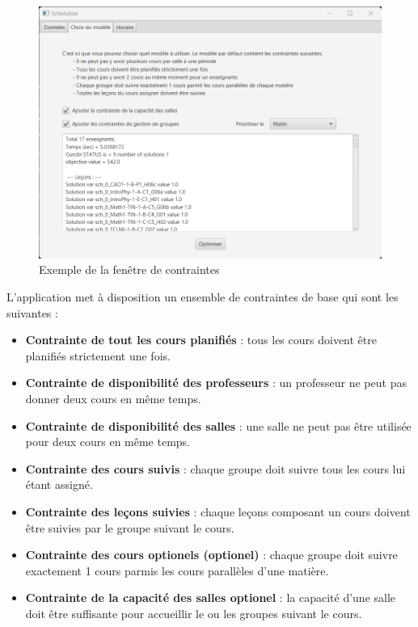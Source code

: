 \begin{figure}[H]
    \centering
    \includegraphics[width=1\textwidth]{./assets/figures/constraintsWindow.png}
    \caption{Exemple de la fenêtre de contraintes}
\end{figure}
\vspace{\baselineskip}

L'application met à disposition un ensemble de contraintes de base qui sont les suivantes :
\begin{itemize}
    \item \textbf{Contrainte de tout les cours planifiés} : tous les cours doivent être planifiés strictement une fois.
    \item \textbf{Contrainte de disponibilité des professeurs} : un professeur ne peut pas donner deux cours en même temps.
    \item \textbf{Contrainte de disponibilité des salles} : une salle ne peut pas être utilisée pour deux cours en même temps.
    \item \textbf{Contrainte des cours suivis} : chaque groupe doit suivre tous les cours lui étant assigné.
    \item \textbf{Contrainte des leçons suivies} : chaque leçons composant un cours doivent être suivies par le groupe suivant le cours.
    \item \textbf{Contrainte des cours optionels (optionel)} : chaque groupe doit suivre exactement 1 cours parmis les cours parallèles d'une matière.
    \item \textbf{Contrainte de la capacité des salles {optionel}} : la capacité d'une salle doit être suffisante pour accueillir le ou les groupes suivant le cours.
\end{itemize}
\vspace{\baselineskip}

